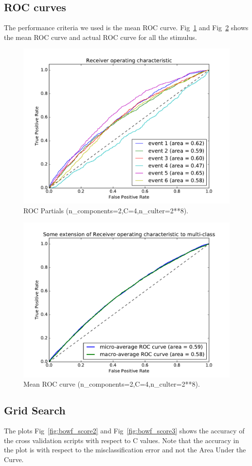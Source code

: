 \documentclass[final,leqno,onefignum,onetabnum]{siamltexmm}
\begin{document}
\subsection{ROC curves}
The performance criteria we used is the mean ROC curve.  
Fig~\ref{fig:roc_hpc} and Fig~\ref{fig:roc_mean} shows the mean ROC curve and actual ROC curve for all the stimulus.
\begin{figure}
  \centering
  \includegraphics[width=0.60\linewidth]{images/ROC6Partials}
  \caption{ROC Partials (n\_components=2,C=4,n\_culter=2**8).\label{fig:roc_hpc}}
\end{figure}
\begin{figure}
  \centering
  \includegraphics[width=0.60\linewidth]{images/ROCMean}
  \caption{Mean ROC curve (n\_components=2,C=4,n\_culter=2**8).\label{fig:roc_mean}}
\end{figure}

\subsection{Grid Search}
The plots Fig~\ref{fig:bowf_score2} and Fig~\ref{fig:bowf_score3} shows the accuracy of the cross validation scripts with respect to C values.  
Note that the accuracy in the plot is with respect to the misclassification error and not the Area Under the Curve.
\end{document}
